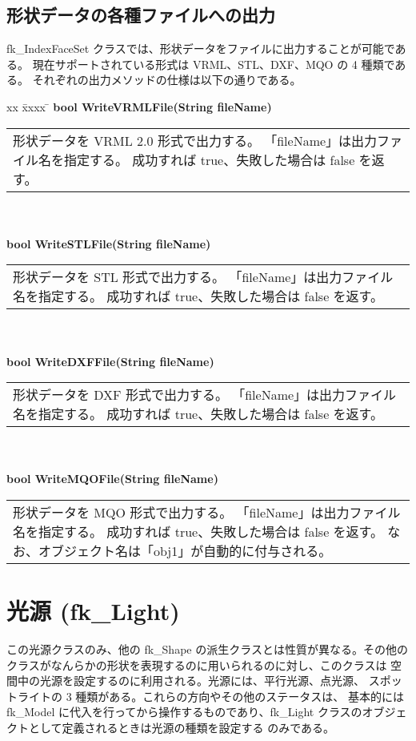 \subsection{形状データの各種ファイルへの出力}
fk\_IndexFaceSet クラスでは、形状データをファイルに出力することが可能である。
現在サポートされている形式は VRML、STL、DXF、MQO の 4 種類である。
それぞれの出力メソッドの仕様は以下の通りである。
\begin{tabbing}
xx \= xxxx \= \kill
\> \textbf{bool WriteVRMLFile(String fileName)} \\
	\> \> \begin{tabular}{p{15cm}}
		形状データを VRML 2.0 形式で出力する。
		「fileName」は出力ファイル名を指定する。
		成功すれば true、失敗した場合は false を返す。
	\end{tabular} \\ \\

\> \textbf{bool WriteSTLFile(String fileName)} \\
	\> \> \begin{tabular}{p{15cm}}
		形状データを STL 形式で出力する。
		「fileName」は出力ファイル名を指定する。
		成功すれば true、失敗した場合は false を返す。
	\end{tabular} \\ \\

\> \textbf{bool WriteDXFFile(String fileName)} \\
	\> \> \begin{tabular}{p{15cm}}
		形状データを DXF 形式で出力する。
		「fileName」は出力ファイル名を指定する。
		成功すれば true、失敗した場合は false を返す。
	\end{tabular} \\ \\

\> \textbf{bool WriteMQOFile(String fileName)} \\
	\> \> \begin{tabular}{p{15cm}}
		形状データを MQO 形式で出力する。
		「fileName」は出力ファイル名を指定する。
		成功すれば true、失敗した場合は false を返す。
		なお、オブジェクト名は「obj1」が自動的に付与される。		
	\end{tabular}
\end{tabbing}

\section{光源 (fk\_Light)}
この光源クラスのみ、他の fk\_Shape の派生クラスとは性質が異なる。その他の
クラスがなんらかの形状を表現するのに用いられるのに対し、このクラスは
空間中の光源を設定するのに利用される。光源には、平行光源、点光源、
スポットライトの 3 種類がある。これらの方向やその他のステータスは、
基本的には fk\_Model に代入を行ってから操作するものであり、fk\_Light
クラスのオブジェクトとして定義されるときは光源の種類を設定する
のみである。

